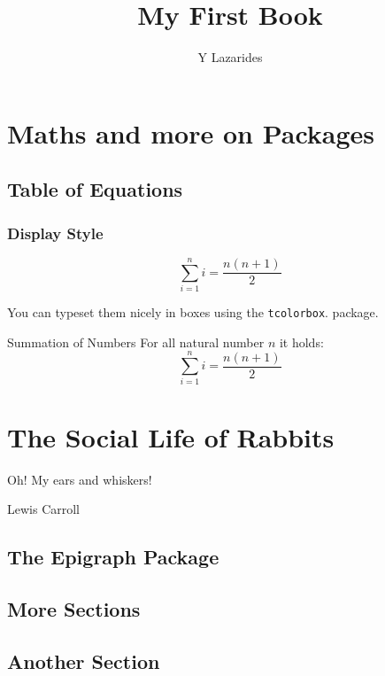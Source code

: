 \documentclass{book}
\title{My First Book}
\author{Y Lazarides}
\newcounter{texercise}[section]
\begin{document}
\maketitle
\tableofcontents

\chapter{Maths and more on Packages}

\section{Table of Equations}


\subsection{Display Style}

 \[\sum\limits_{i=1}^n i = \frac{n(n+1)}{2}\]


You can typeset them nicely in boxes using the \texttt{tcolorbox}. 
package.

\begin{tcolorbox}[colback=blue!5,
                  colframe=blue!50!black,
                  arc=0mm,
                  theorem={Equation}{texercise}{Summation}{myMarker}]{Summation of Numbers}{}
  For all natural number $n$ it holds:\\[2mm]
  \[\displaystyle\sum\limits_{i=1}^n i = \frac{n(n+1)}{2}\]
\end{tcolorbox}


\chapter{The Social Life of Rabbits}
\epigraph{Oh!  My ears and whiskers!}%
         {Lewis Carroll}


\section{The Epigraph Package}
\lipsum[1-30]
\section{More Sections}
\lipsum



\section{Another Section}
\lipsum
\appendix
\end{document}

